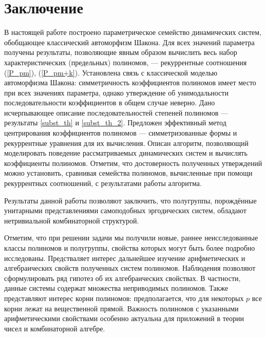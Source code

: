 \documentclass[14pt, a4paper, russian]{report}
\begin{document}
\chapter*{Заключение}
В настоящей работе построено параметрическое семейство динамических систем, обобщающее классический автоморфизм Шакона. Для всех значений параметра получены результаты, позволяющие явным образом вычислить весь набор характеристических (предельных) полиномов, --- рекуррентные соотношения (\ref{P_pm}), (\ref{P_pm+k}). Установлена связь с классической моделью автоморфизма Шакона: симметричность коэффициентов полиномов имеет место при всех значениях параметра, однако утверждение об унимодальности последовательности коэффициентов в общем случае неверно. Дано исчерпывающее описание последовательностей степеней полиномов --- результаты \cref{subst_th} и \cref{subst_th_2}. Предложен эффективный метод центрирования коэффициентов полиномов --- симметризованные формы и рекуррентные уравнения для их вычисления. Описан алгоритм, позволяющий моделировать поведение рассматриваемых динамических систем и вычислять коэффициенты полиномов. Отметим, что достоверность полученных утверждений можно установить, сравнивая семейства полиномов, вычисленные при помощи рекуррентных соотношений, с результатами работы алгоритма.

Результаты данной работы позволяют заключить, что полугруппы, порождённые унитарными представлениями самоподобных эргодических систем, обладают нетривиальной комбинаторной структурой.

Отметим, что при решении задачи мы получили новые, раннее неисследованные классы полиномов и полугруппы, свойства которых могут быть более подробно исследованы. Предстваляет интерес дальнейшее изучение арифметических и алгебраических свойств полученных систем полиномов. Наблюдения позволяют сформулировать ряд гипотез об их алгебраических свойствах. В частности, данные системы содержат множества неприводимых полиномов. Также представляют интерес корни полиномов: предполагается, что для некоторых $p$ все корни лежат на вещественной прямой. Важность полиномов с указанными арифметическими свойствами особенно актуальна для приложений в теории чисел и комбинаторной алгебре.

\newpage

\end{document}
